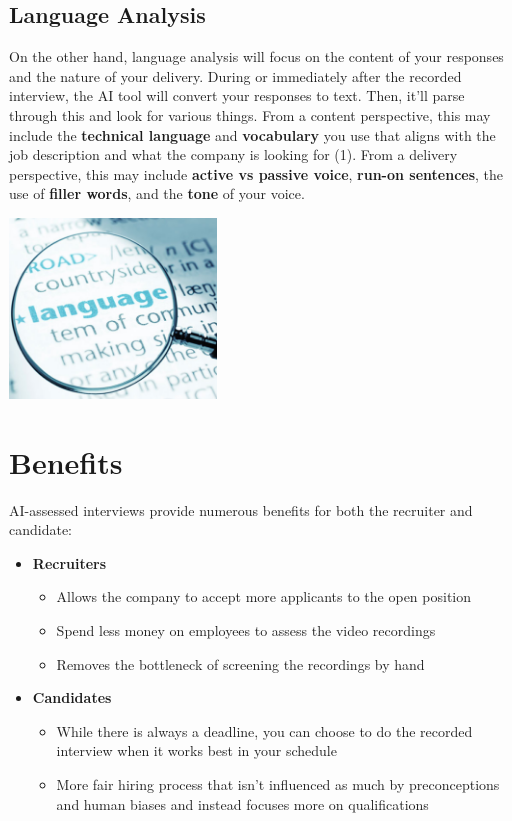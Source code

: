 \documentclass[
]{book}
\begin{document}
\hypertarget{language-analysis}{%
\subsection{Language Analysis}\label{language-analysis}}

On the other hand, language analysis will focus on the content of your responses and the nature of your delivery. During or immediately after the recorded interview, the AI tool will convert your responses to text. Then, it'll parse through this and look for various things. From a content perspective, this may include the \textbf{technical language} and \textbf{vocabulary} you use that aligns with the job description and what the company is looking for (1). From a delivery perspective, this may include \textbf{active vs passive voice}, \textbf{run-on sentences}, the use of \textbf{filler words}, and the \textbf{tone} of your voice.

\includegraphics[width=2.16667in,height=\textheight]{Language_Analysis.png}

\hypertarget{benefits}{%
\section{Benefits}\label{benefits}}

AI-assessed interviews provide numerous benefits for both the recruiter and candidate:

\begin{itemize}
\item
  \textbf{Recruiters}

  \begin{itemize}
  \item
    Allows the company to accept more applicants to the open position~
  \item
    Spend less money on employees to assess the video recordings
  \item
    Removes the bottleneck of screening the recordings by hand
  \end{itemize}
\item
  \textbf{Candidates}

  \begin{itemize}
  \item
    While there is always a deadline, you can choose to do the recorded interview when it works best in your schedule
  \item
    More fair hiring process that isn't influenced as much by preconceptions and human biases and instead focuses more on qualifications
  \end{itemize}
\end{itemize}
\end{document}
